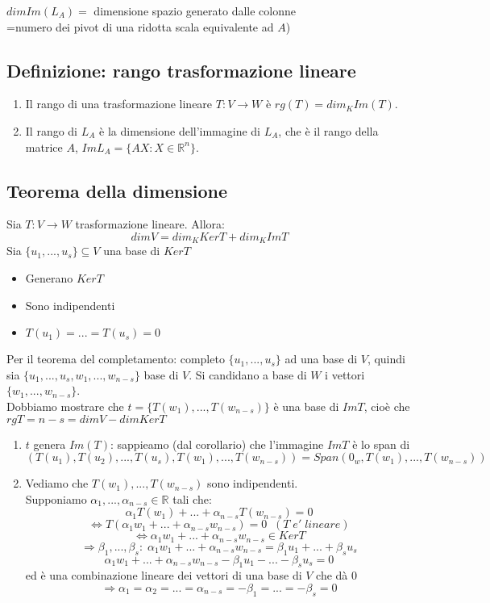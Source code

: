 \begin{center}
$dimIm(L_A)=$ dimensione spazio generato dalle colonne
\\=numero dei pivot di una ridotta scala equivalente ad $A$)
\end{center}

\subsection{Definizione: rango trasformazione lineare}
\begin{enumerate}
	\item Il rango di una trasformazione lineare $T:V\rightarrow W$ è $rg(T)=dim_KIm(T)$.
	\item Il rango di $L_A$ è la dimensione dell'immagine di $L_A$, che è il rango della matrice $A$, $ImL_A=\{AX:X\in\mathbb{R}^n\}$.
\end{enumerate}

\subsection{Teorema della dimensione}
Sia $T:V\rightarrow W$ trasformazione lineare. Allora:
\[dimV=dim_KKerT+dim_KImT\]
Sia $\{u_1,...,u_s\}\subseteq V$ una base di $KerT$
\begin{itemize}
	\item Generano $KerT$
	\item Sono indipendenti
	\item $T(u_1)=...=T(u_s)=0$
\end{itemize}

Per il teorema del completamento: completo $\{u_1,...,u_s\}$ ad una base di $V$, quindi sia $\{u_1,...,u_s,w_1,...,w_{n-s}\}$ base di $V$. Si candidano a base di $W$ i vettori $\{w_1,...,w_{n-s}\}$.
\\Dobbiamo mostrare che $t=\{T(w_1),...,T(w_{n-s})\}$ è una base di $ImT$, cioè che $rgT=n-s=dimV-dimKerT$

\begin{enumerate}
	\item $t$ genera $Im(T)$: sappieamo (dal corollario) che l'immagine $ImT$ è lo span di $(T(u_1),T(u_2),...,T(u_s),T(w_1),...,T(w_{n-s}))=Span(0_w,T(w_1),...,T(w_{n-s}))$
	\item Vediamo che $T(w_1),...,T(w_{n-s})$ sono indipendenti.
	\\Supponiamo $\alpha_1,...,\alpha_{n-s}\in\mathbb{R}$ tali che: 
	\[\alpha_1T(w_1)+...+\alpha_{n-s}T(w_{n-s})=0\]
	\[\Leftrightarrow T(\alpha_1w_1+...+\alpha_{n-s}w_{n-s})=0\;\;(T\;e'\;lineare)\]
	\[\Leftrightarrow \alpha_1w_1+...+\alpha_{n-s}w_{n-s}\in KerT\]
	\[\Rightarrow \beta_1,...,\beta_s:\;\alpha_1w_1+...+\alpha_{n-s}w_{n-s}=\beta_1u_1+...+\beta_su_s\]
	\[\alpha_1w_1+...+\alpha_{n-s}w_{n-s}-\beta_1u_1-...-\beta_su_s=0\]
	ed è una combinazione lineare dei vettori di una base di $V$ che dà $0$
	\[\Rightarrow\alpha_1=\alpha_2=...=\alpha_{n-s}=-\beta_1=...=-\beta_s=0\]
\end{enumerate}

